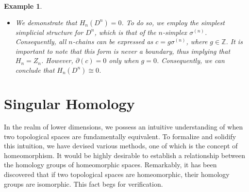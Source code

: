 \documentclass{article}
\newtheorem{example}[definition]{Example}
\begin{document}
\begin{example}
\begin{itemize}
	\begin{equation}
	\label{chain}
	c = \sum_{i=0}^{n+1}g_i (v_0,\ldots,v_{i-1},v_{i+1},\ldots,v_n),
	\end{equation}
	where $g_i \in \mathbb{Z}$. Since $\sigma^{(n+1)}$ itself is not part of the structure, there are no boundaries in $Z_n$, the group of cycles. Therefore, $H_n = Z_n/B_n$ represents the group of cycles. If $c \in Z_n$, then $\partial(c) = 0$. By using Eq. \ref{chain}, we have:
	\begin{align} \partial(c) = &\partial\left(\sum_{i=0}^{n+1} g_i(v_0,\ldots,v_{i-1},v_{i+1},\ldots,v_n) \right) \\ = &\sum_{i=0}^{n+1}g_i \big(\sum_{j1}^{n+1}(-1)^j(v_0,\ldots,v_{i-1},v_{i+1},\ldots,v_{j-1},v_{j+1},\ldots,v_n)\big). \end{align}
	By rearranging this sum, we obtain terms of the form:
	\begin{equation} \label{terms} (g_k-g_l)(v_0,\ldots,v_{j-1},v_{j+1},\ldots,v_{i-1},v_{i+1},\ldots,v_n) \end{equation}
	where $k,l = 0, \ldots, n+1$ for all $i,j = 0, \ldots, n$. Each pair of $n$-simplices of $\sigma^{(n+1)}$ intersect along an $(n-1)$-face. Therefore, we obtain terms of the form given in Eq. \ref{terms} for each of these faces. From this, we can deduce that if $\partial(c) = 0$, we must have $g_k = g_l$ for all $k,l = 0, \ldots, n+1$. In other words, $g_0 = g_1 = \cdots = g_{n+1}$. Consequently, our original $n$-chain can be rewritten as:
	\begin{equation} c = \sum_{i=0}^{n+1}g_0(v_0,\ldots,v_{i-1},v_{i+1},\ldots,v_n), \end{equation}
	allowing us to choose $g_0$ from $\mathbb{Z}$. Thus, we conclude that $H_n(S^n) \cong \mathbb{Z}$.
	\item We demonstrate that $H_n(D^n) = 0$. To do so, we employ the simplest simplicial structure for $D^n$, which is that of the $n$-simplex $\sigma^{(n)}$. Consequently, all $n$-chains can be expressed as $c = g \sigma^{(n)}$, where $g \in \mathbb{Z}$. It is important to note that this form is never a boundary, thus implying that $H_n = Z_n$. However, $\partial(c) = 0$ only when $g = 0$. Consequently, we can conclude that $H_n(D^n) \cong 0$.
\end{itemize}
\end{example}

\section{Singular Homology}
In the realm of lower dimensions, we possess an intuitive understanding of when two topological spaces are fundamentally \glqq equivalent\grqq{}. To formalize and solidify this intuition, we have devised various methods, one of which is the concept of homeomorphism. It would be highly desirable to establish a relationship between the homology groups of homeomorphic spaces. Remarkably, it has been discovered that if two topological spaces are homeomorphic, their homology groups are isomorphic. This fact begs for verification.
\end{document}
